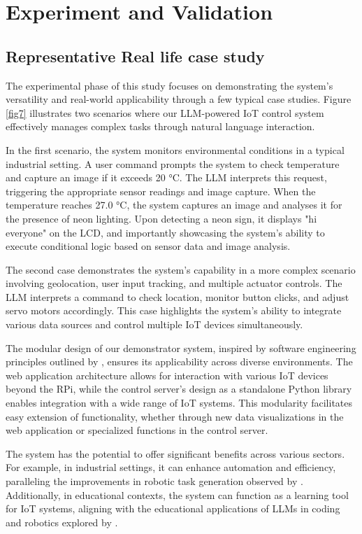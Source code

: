\documentclass[lettersize,journal]{IEEEtran}
\begin{document}
\section{Experiment and Validation}\label{sec:experiment}

\subsection{Representative Real life case study}
The experimental phase of this study focuses on demonstrating the system's versatility and real-world applicability through a few typical case studies. Figure \ref{fig7} illustrates two scenarios where our LLM-powered IoT control system effectively manages complex tasks through natural language interaction.

In the first scenario, the system monitors environmental conditions in a typical industrial setting. A user command prompts the system to check temperature and capture an image if it exceeds 20 °C. The LLM interprets this request, triggering the appropriate sensor readings and image capture. When the temperature reaches 27.0 °C, the system captures an image and analyses it for the presence of neon lighting. Upon detecting a neon sign, it displays "hi everyone" on the LCD, and importantly showcasing the system's ability to execute conditional logic based on sensor data and image analysis.

The second case demonstrates the system's capability in a more complex scenario involving geolocation, user input tracking, and multiple actuator controls. The LLM interprets a command to check location, monitor button clicks, and adjust servo motors accordingly. This case highlights the system's ability to integrate various data sources and control multiple IoT devices simultaneously.

The modular design of our demonstrator system, inspired by software engineering principles outlined by \citet{taylor2010software}, ensures its applicability across diverse environments. The web application architecture allows for interaction with various IoT devices beyond the RPi, while the control server's design as a standalone Python library enables integration with a wide range of IoT systems. This modularity facilitates easy extension of functionality, whether through new data visualizations in the web application or specialized functions in the control server.

The system has the potential to offer significant benefits across various sectors. For example, in industrial settings, it can enhance automation and efficiency, paralleling the improvements in robotic task generation observed by \citet{wang2024gensimgeneratingroboticsimulation}. Additionally, in educational contexts, the system can function as a learning tool for IoT systems, aligning with the educational applications of LLMs in coding and robotics explored by \citet{shu2024llmscodingroboticseducation}.
\end{document}
